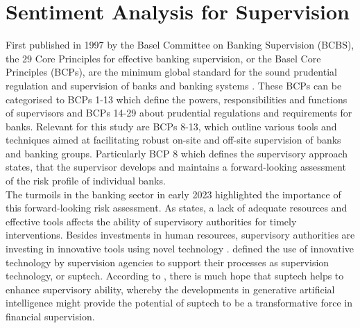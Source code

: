 \chapter{Sentiment Analysis for Supervision}\label{sec2}
\thispagestyle{empty}

First published in 1997 by the Basel Committee on Banking Supervision (BCBS), the 29 Core Principles for effective banking supervision, or the Basel Core Principles (BCPs), are the minimum global standard for the sound prudential regulation and supervision of banks and banking systems \citep{bis2024}. These BCPs can be categorised to BCPs 1-13 which define the powers, responsibilities and functions of supervisors and BCPs 14-29 about prudential regulations and requirements for banks. Relevant for this study are BCPs 8-13, which outline various tools and techniques aimed at facilitating robust on-site and off-site supervision of banks and banking groups. Particularly BCP 8 which defines the supervisory approach states, that the supervisor develops and maintains a forward-looking assessment of the risk profile of individual banks. \\


The turmoils in the banking sector in early 2023 highlighted the importance of this forward-looking risk assessment. As \cite{prenio2024} states, a lack of adequate resources and effective tools affects the ability of supervisory authorities for timely interventions. Besides investments in human resources, supervisory authorities are investing in innovative tools using novel technology \citep{prenio2024}. \cite{broeders2018} defined the use of innovative technology by supervision agencies to support their processes as supervision technology, or suptech. According to \cite{prenio2024}, there is much hope that suptech helps to enhance supervisory ability, whereby the developments in generative artificial intelligence might provide the potential of suptech to be a transformative force in financial supervision. \\


